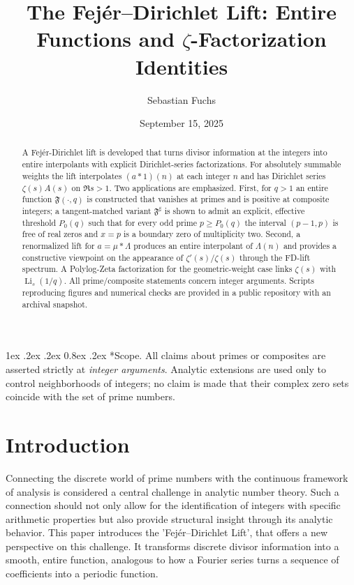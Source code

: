\documentclass[11pt,a4paper]{amsart}
\title[Fej\'er--Dirichlet Lift]{The Fej\'er--Dirichlet Lift: Entire Functions and \texorpdfstring{$\zeta$}{zeta}-Factorization Identities}
\author{Sebastian Fuchs \orcidlink{0009-0009-1237-4804}}
\date{September 15, 2025}
\makeatletter
\renewcommand\paragraph{\@startsection{paragraph}{4}{\z@}%
  {1ex \@plus .2ex \@minus .2ex}%
  {0.8ex \@plus .2ex}%
  {\normalfont\bfseries}}
\theoremstyle{plain}
\theoremstyle{definition}
\theoremstyle{remark}
\makeatother
\begin{document}
\begin{abstract}
A Fej\'er-Dirichlet lift is developed that turns divisor information at the integers into entire interpolants with explicit Dirichlet-series factorizations. For absolutely summable weights the lift interpolates $(a*1)(n)$ at each integer $n$ and has Dirichlet series $\zeta(s)A(s)$ on $\Re s>1$. Two applications are emphasized. First, for $q>1$ an entire function $\mathfrak F(\cdot,q)$ is constructed that vanishes at primes and is positive at composite integers; a tangent-matched variant $\mathfrak F^{\sharp}$ is shown to admit an explicit, effective threshold $P_0(q)$ such that for every odd prime $p\ge P_0(q)$ the interval $(p-1,p)$ is free of real zeros and $x=p$ is a boundary zero of multiplicity two. Second, a renormalized lift for $a=\mu*\Lambda$ produces an entire interpolant of $\Lambda(n)$ and provides a constructive viewpoint on the appearance of $\zeta'(s)/\zeta(s)$ through the FD-lift spectrum. A Polylog-Zeta factorization for the geometric-weight case links $\zeta(s)$ with $\operatorname{Li}_s(1/q)$. All prime/composite statements concern integer arguments. Scripts reproducing figures and numerical checks are provided in a public repository with an archival snapshot.
\end{abstract}

\maketitle


\paragraph*{Scope.}
All claims about primes or composites are asserted strictly at \emph{integer arguments}. Analytic extensions are used only to control neighborhoods of integers; no claim is made that their complex zero sets coincide with the set of prime numbers.

\clearpage
\tableofcontents
\bigskip
\clearpage

\section{Introduction}

Connecting the discrete world of prime numbers with the continuous framework of analysis is considered a central challenge in analytic number theory. Such a connection should not only allow for the identification of integers with specific arithmetic properties but also provide structural insight through its analytic behavior. This paper introduces the 'Fej\'er–Dirichlet Lift', that offers a new perspective on this challenge. It transforms discrete divisor information into a smooth, entire function, analogous to how a Fourier series turns a sequence of coefficients into a periodic function.
\end{document}

